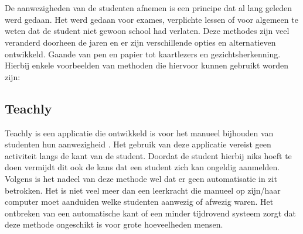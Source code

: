 \chapter{}%
\label{ch:stand-van-zaken}

De aanwezigheden van de studenten afnemen is een principe dat al lang geleden werd gedaan. Het werd gedaan voor exames, verplichte lessen of voor algemeen te weten dat de student niet gewoon school had verlaten. Deze methodes zijn veel veranderd doorheen de jaren en er zijn verschillende opties en alternatieven ontwikkeld. Gaande van pen en papier tot kaartlezers en gezichtsherkenning. Hierbij enkele voorbeelden van methoden die hiervoor kunnen gebruikt worden zijn:

\section{Teachly}
Teachly is een applicatie die ontwikkeld is voor het manueel bijhouden van studenten hun aanwezigheid \autocite{UniHarvard2026}. Het gebruik van deze applicatie vereist geen activiteit langs de kant van de student. Doordat de student hierbij niks hoeft te doen vermijdt dit ook de kans dat een student zich kan ongeldig aanmelden. Volgens \textcite{UniHarvard2026} is het nadeel van deze methode wel dat er geen automatisatie in zit betrokken. Het is niet veel meer dan een leerkracht die manueel op zijn/haar computer moet aanduiden welke studenten aanwezig of afwezig waren. Het ontbreken van een automatische kant of een minder tijdrovend systeem zorgt dat deze methode ongeschikt is voor grote hoeveelheden mensen. 

